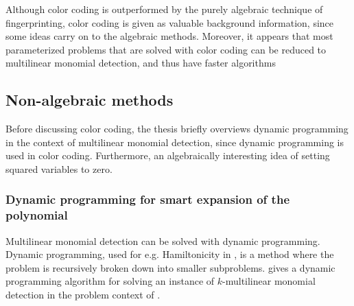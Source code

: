 Although color coding is outperformed by the 
purely algebraic technique of fingerprinting, color coding is given as valuable background information, 
since some ideas carry on to the algebraic methods. Moreover, 
it appears that most parameterized problems that are solved with color coding can be reduced to 
multilinear monomial detection, and thus have faster algorithms



\subsection{Non-algebraic methods}

Before discussing color coding, the thesis briefly overviews dynamic programming in the context of 
multilinear monomial detection, since dynamic programming is used in color coding. Furthermore, 
an algebraically interesting idea of setting squared variables to zero.

\subsubsection{Dynamic programming for smart expansion of the polynomial}

Multilinear monomial detection can be solved with dynamic programming. 
Dynamic programming, used for e.g. Hamiltonicity in \cite{HelKar62}, is a method where the problem 
is recursively broken down into smaller subproblems. \cite{Fomin17} gives a dynamic programming algorithm 
for solving an instance of $k$-multilinear monomial detection in the problem context of 
.

